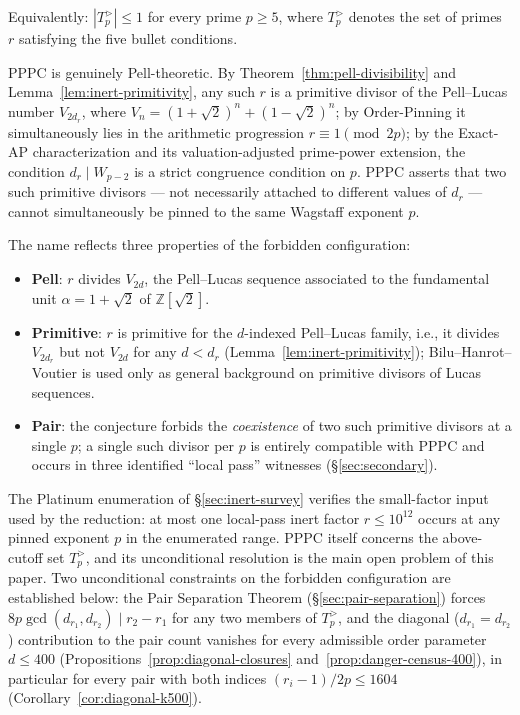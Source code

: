 \documentclass[11pt]{amsart}
\theoremstyle{plain}
\theoremstyle{definition}
\theoremstyle{remark}
\numberwithin{equation}{section}
\newcommand{\Z}{\mathbb{Z}}
\begin{document}
Equivalently: $|T_p^{>}| \leq 1$ for every prime $p \geq 5$, where $T_p^{>}$ denotes the set of primes $r$ satisfying the five bullet conditions.

PPPC is genuinely Pell-theoretic. By Theorem~\ref{thm:pell-divisibility} and Lemma~\ref{lem:inert-primitivity}, any such $r$ is a primitive divisor of the Pell--Lucas number $V_{2 d_r}$, where $V_n = (1+\sqrt 2)^n + (1-\sqrt 2)^n$; by Order-Pinning it simultaneously lies in the arithmetic progression $r \equiv 1 \pmod{2p}$; by the Exact-AP characterization and its valuation-adjusted prime-power extension, the condition $d_r \mid W_{p-2}$ is a strict congruence condition on $p$. PPPC asserts that two such primitive divisors --- not necessarily attached to different values of $d_r$ --- cannot simultaneously be pinned to the same Wagstaff exponent $p$.

The name reflects three properties of the forbidden configuration:

\begin{itemize}
\item \textbf{Pell}: $r$ divides $V_{2 d}$, the Pell--Lucas sequence associated to the fundamental unit $\alpha = 1 + \sqrt 2$ of $\Z[\sqrt 2]$.
\item \textbf{Primitive}: $r$ is primitive for the $d$-indexed Pell--Lucas family, i.e., it divides $V_{2 d_r}$ but not $V_{2 d}$ for any $d < d_r$ (Lemma~\ref{lem:inert-primitivity}); Bilu--Hanrot--Voutier \cite{ref:BHV} is used only as general background on primitive divisors of Lucas sequences.
\item \textbf{Pair}: the conjecture forbids the \emph{coexistence} of two such primitive divisors at a single $p$; a single such divisor per $p$ is entirely compatible with PPPC and occurs in three identified ``local pass'' witnesses (\S\ref{sec:secondary}).
\end{itemize}

The Platinum enumeration of \S\ref{sec:inert-survey} verifies the small-factor input used by the reduction: at most one local-pass inert factor $r \leq 10^{12}$ occurs at any pinned exponent $p$ in the enumerated range. PPPC itself concerns the above-cutoff set $T_p^{>}$, and its unconditional resolution is the main open problem of this paper. Two unconditional constraints on the forbidden configuration are established below: the Pair Separation Theorem (\S\ref{sec:pair-separation}) forces $8 p \gcd(d_{r_1}, d_{r_2}) \mid r_2 - r_1$ for any two members of $T_p^{>}$, and the diagonal ($d_{r_1} = d_{r_2}$) contribution to the pair count vanishes for every admissible order parameter $d \leq 400$ (Propositions~\ref{prop:diagonal-closures} and~\ref{prop:danger-census-400}), in particular for every pair with both indices $(r_i - 1)/2p \leq 1604$ (Corollary~\ref{cor:diagonal-k500}).
\end{document}
